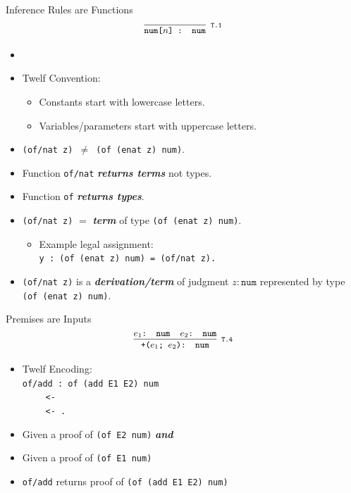 \documentclass{beamer}
\renewcommand{\emph}[1]{\textbf{\textit{#1}}}
\begin{document}
\begin{frame}{Inference Rules are Functions}
\[ \cinfer[T.1]{num[$n$] : num}{ } \]

\begin{itemize}
\item
{}
\item Twelf Convention:
  \begin{itemize}
  \item Constants start with lowercase letters.
  \item Variables/parameters start with uppercase letters.
  \end{itemize}

\pause
\item \texttt{(of/nat z) $\neq$ (of (enat z) num)}.
\item Function \texttt{of/nat} \emph{returns terms} not types.
\item Function \texttt{of} \emph{returns types}.

\pause
\item \texttt{(of/nat z)} $=$ \emph{term} of type \texttt{(of (enat z) num)}.
  \begin{itemize}
  \item Example legal assignment: \\
        \texttt{y : (of (enat z) num) = (of/nat z).}
  \end{itemize}

\pause
\item \texttt{(of/nat z)} is a \emph{derivation/term} of judgment
$z : \texttt{num}$ represented by type \texttt{(of (enat z) num)}.
\end{itemize}
\end{frame}


\begin{frame}{Premises are Inputs}
\[
\cinfer[T.4]{+($e_1$; $e_2$): num}
  {\code{$e_1$: num} & \code{$e_2$: num}}
\]
\begin{itemize}
\item Twelf Encoding: \\
\texttt{of/add : of (add E1 E2) num} \\
$\qquad$ \texttt{<- } \\
$\qquad$ \texttt{<- .}

\item Given a proof of \texttt{(of E2 num)} \emph{and}
\item Given a proof of \texttt{(of E1 num)}
\item \texttt{of/add} returns proof of
\texttt{(of (add E1 E2) num)}

\end{itemize}
\end{frame}
\end{document}
